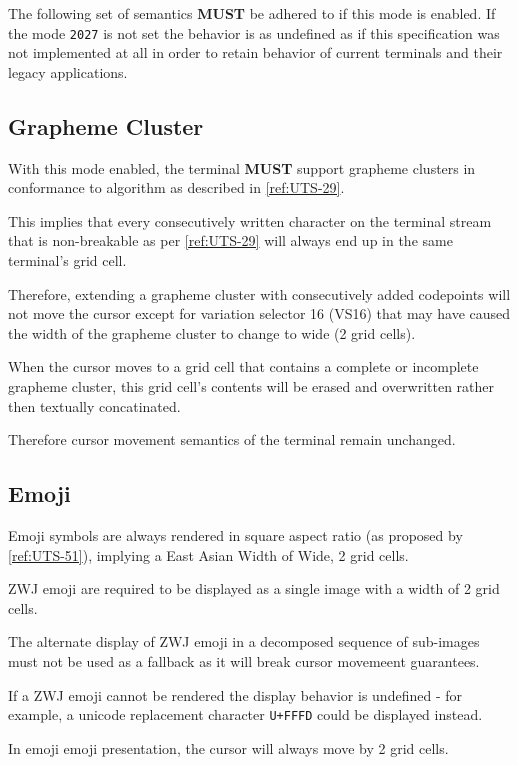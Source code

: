 \documentclass{article}
\newcommand{\code}[1]{\colorbox{light-gray}{\texttt{#1}}}
\newcommand\VtModeNum{2027}                	%
\begin{document}
The following set of semantics \textbf{MUST} be adhered to if this mode is enabled.
If the mode \code{\VtModeNum} is not set the behavior is as undefined as
if this specification was not implemented at all in order to retain
behavior of current terminals and their legacy applications.

\subsection{Grapheme Cluster}

With this mode enabled, the terminal \textbf{MUST} support grapheme clusters
in conformance to algorithm as described in \ref{ref:UTS-29}.

This implies that every consecutively written character on the terminal
stream that is non-breakable as per \ref{ref:UTS-29} will
always end up in the same terminal's grid cell.

Therefore, extending a grapheme cluster with consecutively added codepoints
will not move the cursor except for variation selector 16 (VS16) that may
have caused the width of the grapheme cluster to change to wide (2 grid cells).

When the cursor moves to a grid cell that contains a complete or incomplete
grapheme cluster, this grid cell's contents will be erased and overwritten
rather then textually concatinated.

Therefore cursor movement semantics of the terminal remain unchanged.

\subsection{Emoji}

Emoji symbols are always rendered in square aspect ratio
(as proposed by \ref{ref:UTS-51}),
implying a East Asian Width of Wide, 2 grid cells.

ZWJ emoji are required to be displayed as a single image with a width of 2
grid cells.

The alternate display of ZWJ emoji in a decomposed sequence of sub-images
must not be used as a fallback as it will break cursor movemeent guarantees.

If a ZWJ emoji cannot be rendered the display behavior is undefined -
for example, a unicode replacement character \code{U+FFFD} could be
displayed instead.

In emoji emoji presentation, the cursor will always move by 2 grid cells.
\end{document}
